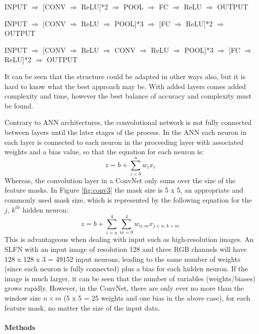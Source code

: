 \documentclass[fleqn,twoside]{article}
\begin{document}
INPUT $\Rightarrow$ [CONV $\Rightarrow$ ReLU]*2  $\Rightarrow$ POOL $\Rightarrow$ FC $\Rightarrow$ ReLU $\Rightarrow$ OUTPUT

INPUT $\Rightarrow$ [CONV $\Rightarrow$ ReLU $\Rightarrow$ POOL]*3  $\Rightarrow$ [FC $\Rightarrow$ ReLU]*2 $\Rightarrow$ OUTPUT

INPUT $\Rightarrow$ [CONV $\Rightarrow$ ReLU $\Rightarrow$ CONV $\Rightarrow$ ReLU $\Rightarrow$ POOL]*3  $\Rightarrow$ [FC $\Rightarrow$ ReLU]*2 $\Rightarrow$ OUTPUT

It can be seen that the structure could be adapted in other ways also, but it is hard to know what the best approach may be. With added layers comes added complexity and time, however the best balance of accuracy and complexity must be found.


Contrary to ANN architectures, the convolutional network is not fully connected between layers until the later stages of the process. In the ANN each neuron in each layer is connected to each neuron in the proceeding layer with associated weights and a bias value, so that the equation for each neuron is:
\begin{equation}
z = b + \sum_{i=0}^{n} w_i x_i
\end{equation}
Whereas, the convolution layer in a ConvNet only sums over the size of the feature masks. In Figure \ref{fig:conv3} the mask size is 5 x 5, an appropriate and commonly used mask size, which is represented by the following equation for the $j$, $k^{th}$ hidden neuron:
\begin{equation}
z = b + \sum_{i=n}^{4} \sum_{m=0}^{4} w_{n,m}  x_{j+n,k+m}
\end{equation}
This is advantageous when dealing with input such as high-resolution images. An SLFN with an input image of resolution 128 and three RGB channels will have 128 x 128 x 3 = 49152 input neurons, leading to the same number of weights (since each neuron is fully connected) plus a bias for each hidden neuron. If the image is much larger, it can be seen that the number of variables (weights/biases) grows rapidly. However, in the ConvNet, there are only ever no more than the window size $n \times m$ (5 x 5 = 25 weights and one bias in the above case), for each feature mask, no matter the size of the input data.


\paragraph{Methods}
\end{document}
